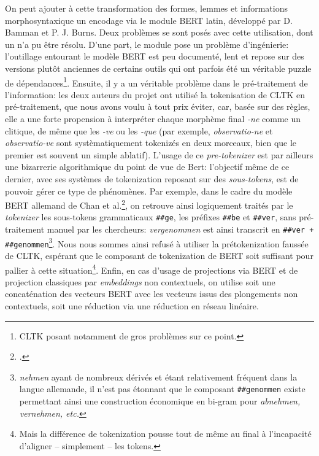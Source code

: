 On peut ajouter à cette transformation des formes, lemmes et informations morphosyntaxique un encodage via le module BERT latin, développé par D. Bamman et P. J. Burns. Deux problèmes se sont posés avec cette utilisation, dont un n'a pu être résolu. D'une part, le module pose un problème d'ingénierie: l'outillage entourant le modèle BERT est peu documenté, lent et repose sur des versions plutôt anciennes de certains outils qui ont parfois été un véritable puzzle de dépendances\footnote{CLTK posant notamment de gros problèmes sur ce point.}. Ensuite, il y a un véritable problème dans le pré-traitement de l'information: les deux auteurs du projet ont utilisé la tokenisation de CLTK en pré-traitement, que nous avons voulu à tout prix éviter, car, basée sur des règles, elle a une forte propension à interpréter chaque morphème final \textit{-ne} comme un clitique, de même que les \textit{-ve} ou les \textit{-que} (par exemple, \textit{observatio-ne} et \textit{observatio-ve} sont systèmatiquement tokenizés en deux morceaux, bien que le premier est souvent un simple ablatif). L'usage de ce \textit{pre-tokenizer} est par ailleurs une bizarrerie algorithmique du point de vue de Bert: l'objectif même de ce dernier, avec ses systèmes de tokenization reposant sur des \textit{sous-tokens}, est de pouvoir gérer ce type de phénomènes. Par exemple, dans le cadre du modèle BERT allemand de Chan et al.\footcite{chan_german_2019}, on retrouve ainsi logiquement traités par le \textit{tokenizer} les sous-tokens grammaticaux \texttt{\#\#ge}, les préfixes \texttt{\#\#be} et \texttt{\#\#ver}, sans pré-traitement manuel par les chercheurs: \textit{vergenommen} est ainsi transcrit en \texttt{\#\#ver + \#\#genommen}\footnote{\textit{nehmen} ayant de nombreux dérivés et étant relativement fréquent dans la langue allemande, il n'est pas étonnant que le composant \texttt{\#\#genommen} existe permettant ainsi une construction économique en bi-gram pour \textit{abnehmen, vernehmen, etc.}}. Nous nous sommes ainsi refusé à utiliser la prétokenization faussée de CLTK, espérant que le composant de tokenization de BERT soit suffisant pour pallier à cette situation\footnote{Mais la différence de tokenization pousse tout de même au final à l'incapacité d'aligner -- simplement -- les tokens.}. Enfin, en cas d'usage de projections via BERT et de projection classiques par \textit{embeddings} non contextuels, on utilise soit une concaténation des vecteurs BERT avec les vecteurs issus des plongements non contextuels, soit une réduction via une réduction en réseau linéaire.


